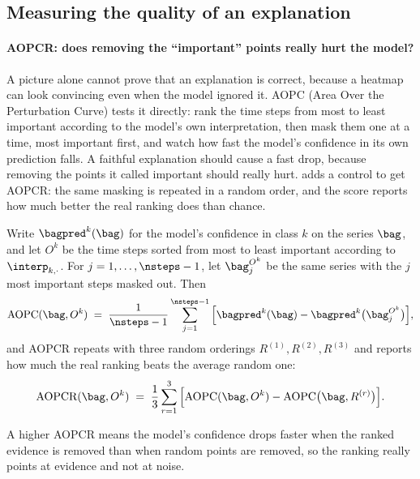 \subsection{Measuring the quality of an explanation}
\label{sec:bg:metrics}

\paragraph{AOPCR: does removing the ``important'' points really hurt the model?}
A picture alone cannot prove that an explanation is correct, because a heatmap can look convincing
even when the model ignored it. AOPC (Area Over the Perturbation Curve) \citep{samek2017aopc} tests
it directly: rank the time steps from most to least important according to the model's own
interpretation, then mask them one at a time, most important first, and watch how fast the model's
confidence in its own prediction falls. A faithful explanation should cause a fast drop, because
removing the points it called important should really hurt. \millet{} \citep{early2024millet} adds
a control to get AOPCR: the same masking is repeated in a random order, and the score reports how
much better the real ranking does than chance.

Write $\bagpred^{k}(\bag)$ for the model's confidence in class $k$ on the series $\bag$, and let
$O^k$ be the time steps sorted from most to least important according to $\interp_{k,\cdot}$. For
$j = 1,\dots,\nsteps-1$, let $\bag^{O^k}_{j}$ be the same series with the $j$ most important steps
masked out. Then
\begin{equation}
  \text{AOPC}(\bag, O^k) \;=\; \frac{1}{\nsteps-1}\sum_{j=1}^{\nsteps-1}
  \Big[\bagpred^{k}(\bag) - \bagpred^{k}\big(\bag^{O^k}_{j}\big)\Big] ,
  \label{eq:aopc}
\end{equation}
and AOPCR repeats  with three random orderings $R^{(1)}, R^{(2)}, R^{(3)}$ and reports
how much the real ranking beats the average random one:
\begin{equation}
  \text{AOPCR}(\bag, O^k) \;=\; \frac{1}{3}\sum_{r=1}^{3}
  \Big[\text{AOPC}(\bag, O^k) - \text{AOPC}\big(\bag, R^{(r)}\big)\Big] .
  \label{eq:aopcr}
\end{equation}

A higher AOPCR means the model's confidence drops faster when the ranked evidence is removed than
when random points are removed, so the ranking really points at evidence and not at noise.

